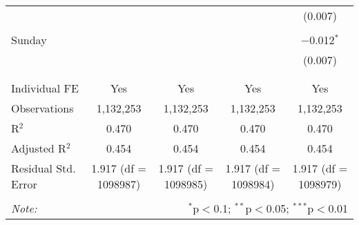 \documentclass[
]{article}
\begin{document}
\begin{table}[!htbp]
{\begin{tabular}{@{\extracolsep{5pt}}lcccc}
  &  &  &  & (0.007) \\ 
  & & & & \\ 
 Sunday &  &  &  & $-$0.012$^{*}$ \\ 
  &  &  &  & (0.007) \\ 
  & & & & \\ 
\hline \\[-1.8ex] 
Individual FE & Yes & Yes & Yes & Yes \\ 
Observations & 1,132,253 & 1,132,253 & 1,132,253 & 1,132,253 \\ 
R$^{2}$ & 0.470 & 0.470 & 0.470 & 0.470 \\ 
Adjusted R$^{2}$ & 0.454 & 0.454 & 0.454 & 0.454 \\ 
Residual Std. Error & 1.917 (df = 1098987) & 1.917 (df = 1098985) & 1.917 (df = 1098984) & 1.917 (df = 1098979) \\ 
\hline 
\hline \\[-1.8ex] 
\textit{Note:}  & \multicolumn{4}{r}{$^{*}$p$<$0.1; $^{**}$p$<$0.05; $^{***}$p$<$0.01} \\ 
\end{tabular}
} 
\end{table} 
\newpage
\end{document}
